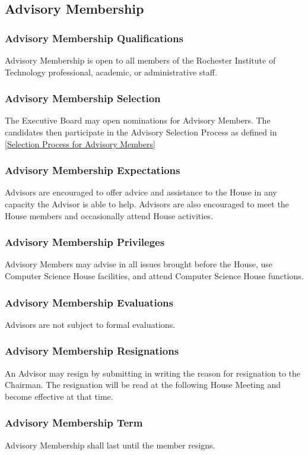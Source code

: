 \documentclass{article}
\newcommand{\asection}[1]{\subsection{#1} \label{#1}}
\newcommand{\asubsection}[1]{\subsubsection{#1} \label{#1}}
\begin{document}
\asection{Advisory Membership}
\asubsection{Advisory Membership Qualifications}
Advisory Membership is open to all members of the Rochester Institute of Technology professional, academic, or administrative staff.
\asubsection{Advisory Membership Selection}
The Executive Board may open nominations for Advisory Members. The candidates then participate in the Advisory Selection Process as defined in \ref{Selection Process for Advisory Members}
\asubsection{Advisory Membership Expectations}
Advisors are encouraged to offer advice and assistance to the House in any capacity the Advisor is able to help. Advisors are also encouraged to meet the House members and occasionally attend House activities.
\asubsection{Advisory Membership Privileges}
Advisory Members may advise in all issues brought before the House, use Computer Science House facilities, and attend Computer Science House functions.
\asubsection{Advisory Membership Evaluations}
Advisors are not subject to formal evaluations.
\asubsection{Advisory Membership Resignations}
An Advisor may resign by submitting in writing the reason for resignation to the Chairman. The resignation will be read at the following House Meeting and become effective at that time.
\asubsection{Advisory Membership Term}
Advisory Membership shall last until the member resigns.
\end{document}
